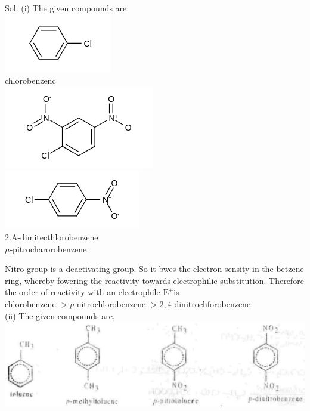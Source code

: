 \documentclass[10pt]{article}
\begin{document}
Sol. (i) The given compounds are\\
\includegraphics{smile-67d6ad6b1cc972ea04712dc6879a19fa61be9a60}\\
chlorobenzenc\\
\includegraphics{smile-35f61c19b367c777b0add88a0f5d98a08ca10f1b}\\
\includegraphics{smile-31888a5f25abca14e0fd8e36766a3b7d94766e38}\\
2.A-dimitecthlorobenzene\\
$\mu$-pitrocharorobenzene

Nitro group is a deactivating group. So it bwes the electron sensity in the betzene ring, whereby fowering the reactivity towards electrophilic substitution. Therefore the order of reactivity with an electrophile $\mathrm{E}^{+}$is\\
chlorobenzene $>p$-nitrochlorobenzene $>2,4$-dinitrochforobenzene\\
(ii) The given compounds are,\\
\includegraphics[max width=\textwidth, center]{2025_01_28_8470952b98110cec3aabg-216}
\end{document}
